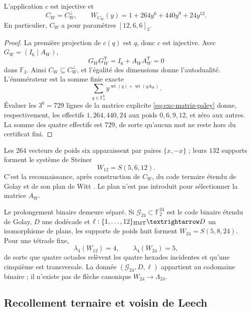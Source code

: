 \begin{theorem}
\label{thm:exc-codigo-ternario}
L'application \(c\) est injective et
\begin{equation}
 C_W=C_W^\perp,
 \qquad
 W_{C_W}(y)=1+264y^6+440y^9+24y^{12}.
 \label{eq:exc-enumerador-cw}
\end{equation}
En particulier, \(C_W\) a pour paramètres \([12,6,6]_3\).
\end{theorem}

\begin{proof}
La première projection de \(c(q)\) est \(q\), donc \(c\) est injective.
Avec \(G_W=(I_6\mid A_W)\),
\[
 G_WG_W^{\mathsf T}=I_6+A_WA_W^{\mathsf T}=0
\]
dans \(\mathbb F_3\). Ainsi \(C_W\subseteq C_W^\perp\), et l'égalité des
dimensions donne l'autodualité. L'énumérateur est la somme finie exacte
\[
 \sum_{q\in\mathbb F_3^6}
 y^{\operatorname{wt}(q)+\operatorname{wt}(qA_W)}.
\]
Évaluer les \(3^6=729\) lignes de la matrice explicite
\eqref{eq:exc-matriz-paley} donne, respectivement, les effectifs
\(1,264,440,24\) aux poids \(0,6,9,12\), et zéro aux autres. La somme
des quatre effectifs est \(729\), de sorte qu'aucun mot ne reste hors
du certificat fini.
\end{proof}

Les \(264\) vecteurs de poids six apparaissent par paires \(\{x,-x\}\) ; leurs
\(132\) supports forment le système de Steiner
\begin{equation}
 W_{12}=S(5,6,12).
 \label{eq:exc-w12}
\end{equation}
C'est la reconnaissance, après construction de \(C_W\), du code ternaire
étendu de Golay et de son plan de Witt
\citep{MacWilliamsSloane1977,ConwaySloane1999}. Le plan n'est pas introduit
pour sélectionner la matrice \(A_W\).

Le prolongement binaire demeure séparé. Si
\(\mathcal G_{24}\subset\mathbb F_2^{24}\) est le code binaire étendu
de Golay, \(D\) une dodécade et
\(\ell:\{1,\ldots,12\}_{\rm HMT}\to D\) un isomorphisme de plans, les
supports de poids huit forment \(W_{24}=S(5,8,24)\). Pour une tétrade fixe,
\[
 \lambda_4(W_{12})=4,
 \qquad
 \lambda_4(W_{24})=5,
\]
de sorte que quatre octades relèvent les quatre hexades incidentes et qu'une cinquième
est transversale. La donnée \((\mathcal G_{24},D,\ell)\) appartient au codomaine
binaire ; il n'existe pas de flèche canonique \(W_{24}\to\Lambda_{24}\).

\subsection{Recollement ternaire et voisin de Leech}

